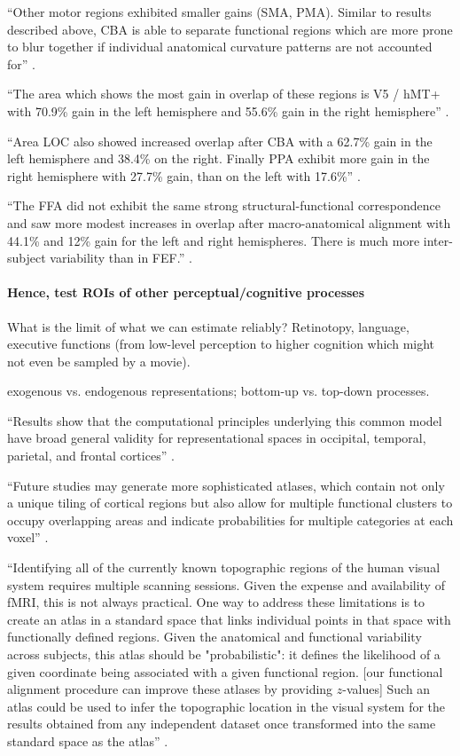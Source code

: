 ``Other motor regions exhibited smaller gains (SMA, PMA).
%
Similar to results described above, CBA is able to separate functional regions
which are more prone to blur together if individual anatomical curvature
patterns are not accounted for'' \citep{frost2012measuring}.

``The area which shows the most gain in overlap of these regions is V5 / hMT+
with 70.9\% gain in the left hemisphere and 55.6\% gain in the right
hemisphere'' \citep{frost2012measuring}.

``Area LOC also showed increased overlap after CBA with a 62.7\% gain in the
left hemisphere and 38.4\% on the right.
%
Finally PPA exhibit more gain in the right hemisphere with 27.7\% gain, than on
the left with 17.6\%'' \citep{frost2012measuring}.

``The FFA did not exhibit the same strong structural-functional correspondence
and saw more modest increases in overlap after macro-anatomical alignment with
44.1\% and 12\% gain for the left and right hemispheres.
%
There is much more inter-subject variability than in FEF.''
\citep{frost2012measuring}.


\paragraph{Hence, test ROIs of other perceptual/cognitive processes}

What is the limit of what we can estimate reliably?
%
Retinotopy, language, executive functions (from low-level perception to higher
cognition which might not even be sampled by a movie).

%
exogenous vs. endogenous representations; bottom-up vs. top-down processes.


``Results show that the computational principles underlying this common
model have broad general validity for representational spaces in occipital,
temporal, parietal, and frontal cortices'' \citep{guntupalli2016model}.

``Future studies may generate more sophisticated atlases, which contain not only
a unique tiling of cortical regions but also allow for multiple functional
clusters to occupy overlapping areas and indicate probabilities for multiple
categories at each voxel'' \citep{rosenke2021probabilistic}.

``Identifying all of the currently known topographic regions of the human visual
system requires multiple scanning sessions.
%
Given the expense and availability of fMRI, this is not always practical.
%
One way to address these limitations is to create an atlas in a standard space
that links individual points in that space with functionally defined regions.
%
Given the anatomical and functional variability across subjects, this atlas
should be "probabilistic": it defines the likelihood of a given coordinate being
associated with a given functional region. [our functional alignment procedure
can improve these atlases by providing $z$-values]
%
Such an atlas could be used to infer the topographic location in the visual
system for the results obtained from any independent dataset once transformed
into the same standard space as the atlas'' \citep{wang2015probabilistic}.

